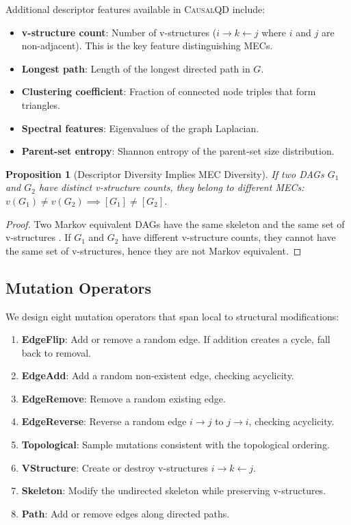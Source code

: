 \documentclass[11pt,a4paper]{article}
\newtheorem{proposition}[theorem]{Proposition}
\begin{document}
Additional descriptor features available in \textsc{CausalQD} include:
\begin{itemize}[leftmargin=*]
    \item \textbf{v-structure count}: Number of v-structures ($i \to k \gets j$ where $i$ and $j$ are non-adjacent). This is the key feature distinguishing MECs.
    \item \textbf{Longest path}: Length of the longest directed path in $G$.
    \item \textbf{Clustering coefficient}: Fraction of connected node triples that form triangles.
    \item \textbf{Spectral features}: Eigenvalues of the graph Laplacian.
    \item \textbf{Parent-set entropy}: Shannon entropy of the parent-set size distribution.
\end{itemize}

\begin{proposition}[Descriptor Diversity Implies MEC Diversity]
\label{prop:desc-mec}
If two DAGs $G_1$ and $G_2$ have distinct v-structure counts, they belong to different MECs: $v(G_1) \neq v(G_2) \implies [G_1] \neq [G_2]$.
\end{proposition}

\begin{proof}
Two Markov equivalent DAGs have the same skeleton and the same set of v-structures \citep{verma1990equivalence}. If $G_1$ and $G_2$ have different v-structure counts, they cannot have the same set of v-structures, hence they are not Markov equivalent.
\end{proof}

\subsection{Mutation Operators}

We design eight mutation operators that span local to structural modifications:

\begin{enumerate}[leftmargin=*]
    \item \textbf{EdgeFlip}: Add or remove a random edge. If addition creates a cycle, fall back to removal.
    \item \textbf{EdgeAdd}: Add a random non-existent edge, checking acyclicity.
    \item \textbf{EdgeRemove}: Remove a random existing edge.
    \item \textbf{EdgeReverse}: Reverse a random edge $i \to j$ to $j \to i$, checking acyclicity.
    \item \textbf{Topological}: Sample mutations consistent with the topological ordering.
    \item \textbf{VStructure}: Create or destroy v-structures $i \to k \gets j$.
    \item \textbf{Skeleton}: Modify the undirected skeleton while preserving v-structures.
    \item \textbf{Path}: Add or remove edges along directed paths.
\end{enumerate}
\end{document}
